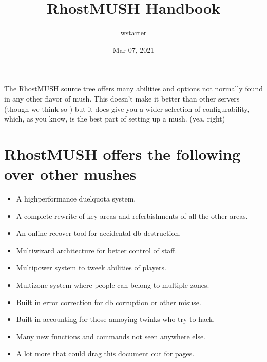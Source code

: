 \documentclass[letterpaper,10pt,english]{sphinxmanual}
\title{RhostMUSH Handbook}
\date{Mar 07, 2021}
\author{wstarter}
\begin{document}
\pagestyle{empty}
\sphinxmaketitle
\pagestyle{plain}
\sphinxtableofcontents
\pagestyle{normal}
\label{\detokenize{index::doc}}


\sphinxAtStartPar
The RhostMUSH source tree offers many abilities and options
not normally found in any other flavor of mush.  This doesn’t
make it better than other servers (though we think so )
but it does give you a wider selection of configurability,
which, as you know, is the best part of setting up a mush.
(yea, right)


\chapter{RhostMUSH offers the following over other mushes}
\label{\detokenize{index:rhostmush-offers-the-following-over-other-mushes}}\begin{itemize}
\item {} 
\sphinxAtStartPar
A high\sphinxhyphen{}performance duel\sphinxhyphen{}quota system.

\item {} 
\sphinxAtStartPar
A complete rewrite of key areas and referbishments of all the other areas.

\item {} 
\sphinxAtStartPar
An on\sphinxhyphen{}line recover tool for accidental db destruction.

\item {} 
\sphinxAtStartPar
Multi\sphinxhyphen{}wizard architecture for better control of staff.

\item {} 
\sphinxAtStartPar
Multi\sphinxhyphen{}power system to tweek abilities of players.

\item {} 
\sphinxAtStartPar
Multi\sphinxhyphen{}zone system where people can belong to multiple zones.

\item {} 
\sphinxAtStartPar
Built in error correction for db corruption or other misuse.

\item {} 
\sphinxAtStartPar
Built in accounting for those annoying twinks who try to hack.

\item {} 
\sphinxAtStartPar
Many new functions and commands not seen anywhere else.

\item {} 
\sphinxAtStartPar
A lot more that could drag this document out for pages.

\end{itemize}
\end{document}
